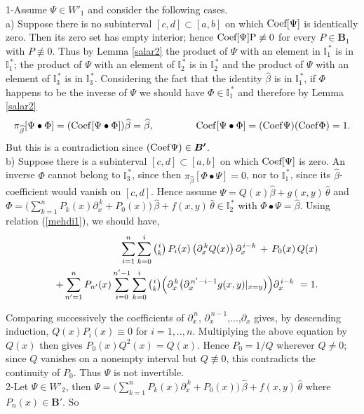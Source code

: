 \documentclass[10pt]{article}
\newcommand{\be}{\begin{equation}}
\newcommand{\ee}{\end{equation}}
\newcommand{\bea}{\begin{eqnarray}}
\newcommand{\eea}{\end{eqnarray}}
\newcommand{\nn}{\nonumber}
\newcommand{\rd}{\partial}
\newcommand{\mIs}{{{\mathbb I}}^{\,*}}
\newcommand{\Cof}{\rm Coef}
\begin{document}
{{1-Assume $\Psi\in {W'}_{1}$ and consider the following cases. \\

a)\,\,Suppose  there is no subinterval $[c,d]\subset[a,b]$ on which
$\Cof[\Psi]$ is identically zero. Then its zero set has empty
interior; hence $\Cof[\Psi]P\not\equiv0$ for every
$P\in\boldsymbol B_1$ with $P\not\equiv0$. Thus by Lemma
\ref{salar2} the product of $\Psi$ with an element in $\mIs_1$ is in
$\mIs_1$; the product of $\Psi$ with an element of $\mIs_2$ is in
$\mIs_2$ and the product of $\Psi$ with an element of $\mIs_3$ is in
$\mIs_3$. Considering the fact that  the identity $\widehat{\beta}$
is in $\mIs_1$, if $\Phi$ happens to be the inverse of $\Psi$ we
should have $\Phi\in\mIs_1$ and therefore by Lemma \ref{salar2} \be
{\pi}_{\widehat{\beta}}[\Psi\bullet\Phi]=({\Cof}[\Psi\bullet\Phi])\widehat{\beta}=\widehat{\beta},
\hspace{1.5cm} {\Cof}[\Psi\bullet\Phi]=({\Cof}\Psi) ({\Cof}\Phi)=1.
\label{nima}\nn\ee But this is a contradiction since
$({\Cof}\Psi)\in \boldsymbol {B'}$.\\

b) Suppose there is a subinterval $[c,d]\subset[a,b]$ on which
$\Cof[\Psi]$ is zero. An inverse $\Phi$ cannot belong to $\mIs_3$,
since then ${\pi}_{\widehat\beta}[\Phi\bullet\Psi]=0$, nor to
$\mIs_1$, since its $\widehat\beta$-coefficient would vanish on
$[c,d]$. Hence assume
$\Psi=Q(x)\widehat{\beta}+g(x,y)\,\widehat{\theta}$ and
$\Phi=\big(\sum^{n}_{k=1} P_{k}(x)
\rd_{x}^{\,k}+P_{0}(x)\big)\,\widehat{\beta}+
 f(x,y)\,\widehat{\theta}\in\mIs_2$ with
$\Phi\bullet\Psi=\widehat\beta$. Using relation (\ref{mehdi1}), we should have, \bea &&\sum^{n}_{i=1}
\sum^{i}_{k=0} {\tbinom ik} \,P_{i}(x)\,\big(\rd^{\,k}_{x}
Q(x)\big)\,\rd^{\,i-k}_{x}\,+\,P_{0}(x)
\,Q(x)\nn\\&&+\sum^{n}_{n'=1}P_{n'}(x)\sum^{n'-1}_{i=0}
\sum^{i}_{k=0} {\tbinom ik} \Big(\rd^{\,k}_{x} \big
(\rd^{\,n'-i-1}_{x}
g(x,y)|_{x=y}\big)\Big)\rd^{\,i-k}_{x}\,\,=1.\label{zaki}\nn\eea

Comparing successively the coefficients of $\rd^{\,n}_{x}$,
$\rd^{\,n-1}_{x}$,...,$\rd_{x}$ gives, by descending induction,
$Q(x)P_{i}(x)\equiv0$ for $i=1,..,n$. Multiplying the above equation
by $Q(x)$ then gives $P_{0}(x)Q^{2}(x)=Q(x)$. Hence
$P_0=1/Q$ wherever $Q\ne0$; since $Q$ vanishes on a nonempty
interval but $Q\not\equiv0$, this contradicts the continuity of
$P_0$. Thus $\Psi$ is not invertible.\\


2-Let $\Psi\in {W'}_{2}$, then $\Psi=\big(\sum^{n}_{k=1} P_{k}(x)
\rd_{x}^{\,k}+P_{0}(x)\big)\,\widehat{\beta}+
 f(x,y)\,\widehat{\theta}$ where $P_{n}(x)\in \boldsymbol{B'}$. So

}}
\end{document}
